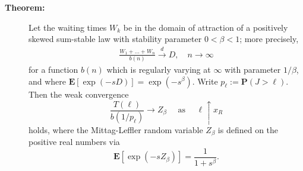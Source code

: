 \documentclass[]{elsarticle} %
\begin{document}
\begin{description}
\item[\textbf{Theorem:}]
Let the waiting times \(W_k\) be in the domain of attraction of a
positively skewed sum-stable law with stability parameter
\(0 < \beta < 1\); more precisely, \begin{align} \label{eq:stability}
\frac{W_1 + \ldots + W_n}{b(n)} \overset{d}{\longrightarrow} D, 
\quad n \to \infty
\end{align} for a function \(b(n)\) which is regularly varying at
\(\infty\) with parameter \(1/\beta\), and where
\(\mathbf E[\exp(-sD)] = \exp(-s^\beta)\). Write
\(p_{\ell} := \mathbf P(J > \ell)\). Then the weak convergence \[
\frac{T(\ell)} {b(1/p_{\ell})} \to Z_\beta \quad \text{ as } \quad \ell \uparrow x_R
\] holds, where the Mittag-Leffler random variable \(Z_\beta\) is
defined on the positive real numbers via \[
\mathbf E[\exp(-sZ_\beta)] = \frac{1}{1+s^\beta}.
\]
\end{description}
\end{document}
